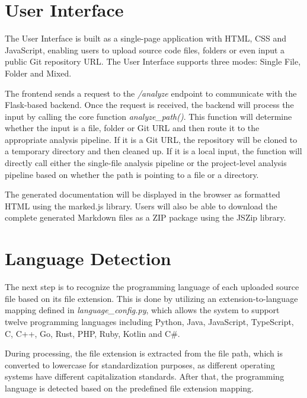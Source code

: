 \section{User Interface}
\hspace{0.5cm} The User Interface is built as a single-page application with HTML, CSS and JavaScript, enabling users to upload source code files, folders or even input a public Git repository URL. The User Interface supports three modes: Single File, Folder and Mixed.

\par The frontend sends a request to the \textit{/analyze} endpoint to communicate with the Flask-based backend. Once the request is received, the backend will process the input by calling the core function \textit{analyze\_path()}. This function will determine whether the input is a file, folder or Git URL and then route it to the appropriate analysis pipeline. If it is a Git URL, the repository will be cloned to a temporary directory and then cleaned up. If it is a local input, the function will directly call either the single-file analysis pipeline or the project-level analysis pipeline based on whether the path is pointing to a file or a directory.

\par The generated documentation will be displayed in the browser as formatted HTML using the marked.js library. Users will also be able to download the complete generated Markdown files as a ZIP package using the JSZip library.

\section{Language Detection}
\hspace{0.5cm}
The next step is to recognize the programming language of each uploaded source file based on its file extension. This is done by utilizing an extension-to-language mapping defined in \textit{language\_config.py}, which allows the system to support twelve programming languages including Python, Java, JavaScript, TypeScript, C, C++, Go, Rust, PHP, Ruby, Kotlin and C#.

\par During processing, the file extension is extracted from the file path, which is converted to lowercase for standardization purposes, as different operating systems have different capitalization standards. After that, the programming language is detected based on the predefined file extension mapping.

